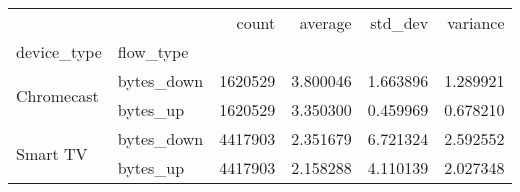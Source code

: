 \begin{tabular}{llrrrr}
\toprule
 &  & count & average & std_dev & variance \\
device_type & flow_type &  &  &  &  \\
\midrule
\multirow[t]{2}{*}{Chromecast} & bytes_down & 1620529 & 3.800046 & 1.663896 & 1.289921 \\
 & bytes_up & 1620529 & 3.350300 & 0.459969 & 0.678210 \\
\cline{1-6}
\multirow[t]{2}{*}{Smart TV} & bytes_down & 4417903 & 2.351679 & 6.721324 & 2.592552 \\
 & bytes_up & 4417903 & 2.158288 & 4.110139 & 2.027348 \\
\cline{1-6}
\bottomrule
\end{tabular}
